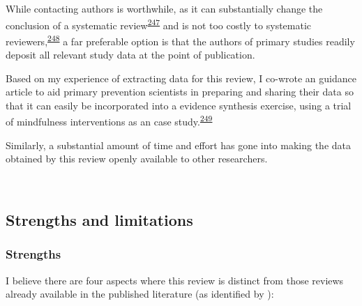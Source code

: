 \documentclass[a4paper, twoside]{templates/ociamthesis}
\begin{document}
While contacting authors is worthwhile, as it can substantially change the conclusion of a systematic review\textsuperscript{\protect\hyperlink{ref-meursingereynders2019}{247}} and is not too costly to systematic reviewers,\textsuperscript{\protect\hyperlink{ref-cooper2019}{248}} a far preferable option is that the authors of primary studies readily deposit all relevant study data at the point of publication.

Based on my experience of extracting data for this review, I co-wrote an guidance article to aid primary prevention scientists in preparing and sharing their data so that it can easily be incorporated into a evidence synthesis exercise, using a trial of mindfulness interventions as an case study.\textsuperscript{\protect\hyperlink{ref-hennessy2021}{249}}

Similarly, a substantial amount of time and effort has gone into making the data obtained by this review openly available to other researchers.

~

\hypertarget{strengths-and-limitations}{%
\subsection{Strengths and limitations}\label{strengths-and-limitations}}

\hypertarget{strengths}{%
\subsubsection{Strengths}\label{strengths}}

I believe there are four aspects where this review is distinct from those reviews already available in the published literature (as identified by ):
\end{document}
